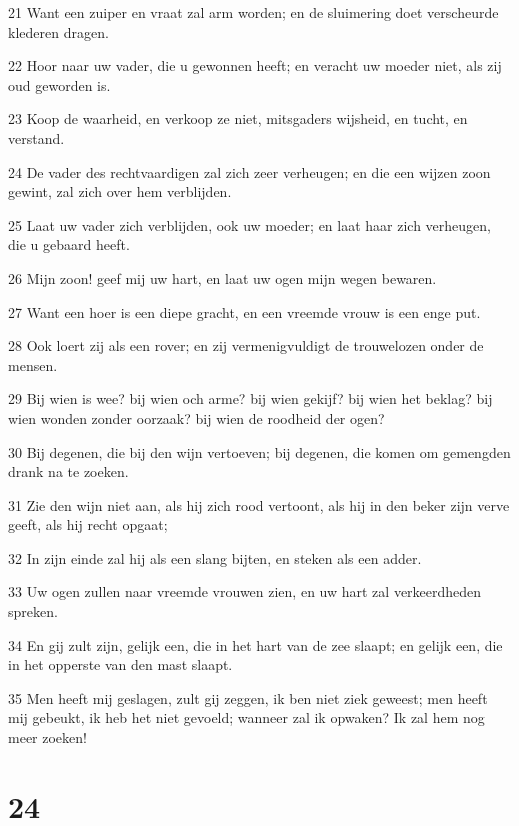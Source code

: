 \par 21 Want een zuiper en vraat zal arm worden; en de sluimering doet verscheurde klederen dragen.
\par 22 Hoor naar uw vader, die u gewonnen heeft; en veracht uw moeder niet, als zij oud geworden is.
\par 23 Koop de waarheid, en verkoop ze niet, mitsgaders wijsheid, en tucht, en verstand.
\par 24 De vader des rechtvaardigen zal zich zeer verheugen; en die een wijzen zoon gewint, zal zich over hem verblijden.
\par 25 Laat uw vader zich verblijden, ook uw moeder; en laat haar zich verheugen, die u gebaard heeft.
\par 26 Mijn zoon! geef mij uw hart, en laat uw ogen mijn wegen bewaren.
\par 27 Want een hoer is een diepe gracht, en een vreemde vrouw is een enge put.
\par 28 Ook loert zij als een rover; en zij vermenigvuldigt de trouwelozen onder de mensen.
\par 29 Bij wien is wee? bij wien och arme? bij wien gekijf? bij wien het beklag? bij wien wonden zonder oorzaak? bij wien de roodheid der ogen?
\par 30 Bij degenen, die bij den wijn vertoeven; bij degenen, die komen om gemengden drank na te zoeken.
\par 31 Zie den wijn niet aan, als hij zich rood vertoont, als hij in den beker zijn verve geeft, als hij recht opgaat;
\par 32 In zijn einde zal hij als een slang bijten, en steken als een adder.
\par 33 Uw ogen zullen naar vreemde vrouwen zien, en uw hart zal verkeerdheden spreken.
\par 34 En gij zult zijn, gelijk een, die in het hart van de zee slaapt; en gelijk een, die in het opperste van den mast slaapt.
\par 35 Men heeft mij geslagen, zult gij zeggen, ik ben niet ziek geweest; men heeft mij gebeukt, ik heb het niet gevoeld; wanneer zal ik opwaken? Ik zal hem nog meer zoeken!

\chapter{24}

